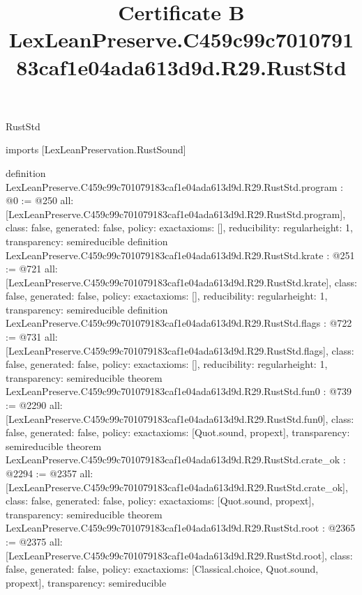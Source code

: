 \begin{lexlean}{RustStd}
\title{Certificate B LexLeanPreserve.C459c99c701079183caf1e04ada613d9d.R29.RustStd}
\begin{coremodule}
imports [LexLeanPreservation.RustSound]

definition LexLeanPreserve.C459c99c701079183caf1e04ada613d9d.R29.RustStd.program : @0 := @250 {
  all: [LexLeanPreserve.C459c99c701079183caf1e04ada613d9d.R29.RustStd.program],
  class: false,
  generated: false,
  policy: exact{axioms: []},
  reducibility: regular{height: 1},
  transparency: semireducible
}
definition LexLeanPreserve.C459c99c701079183caf1e04ada613d9d.R29.RustStd.krate : @251 := @721 {
  all: [LexLeanPreserve.C459c99c701079183caf1e04ada613d9d.R29.RustStd.krate],
  class: false,
  generated: false,
  policy: exact{axioms: []},
  reducibility: regular{height: 1},
  transparency: semireducible
}
definition LexLeanPreserve.C459c99c701079183caf1e04ada613d9d.R29.RustStd.flags : @722 := @731 {
  all: [LexLeanPreserve.C459c99c701079183caf1e04ada613d9d.R29.RustStd.flags],
  class: false,
  generated: false,
  policy: exact{axioms: []},
  reducibility: regular{height: 1},
  transparency: semireducible
}
theorem LexLeanPreserve.C459c99c701079183caf1e04ada613d9d.R29.RustStd.fun0 : @739 := @2290 {
  all: [LexLeanPreserve.C459c99c701079183caf1e04ada613d9d.R29.RustStd.fun0],
  class: false,
  generated: false,
  policy: exact{axioms: [Quot.sound, propext]},
  transparency: semireducible
}
theorem LexLeanPreserve.C459c99c701079183caf1e04ada613d9d.R29.RustStd.crate_ok : @2294 := @2357 {
  all: [LexLeanPreserve.C459c99c701079183caf1e04ada613d9d.R29.RustStd.crate_ok],
  class: false,
  generated: false,
  policy: exact{axioms: [Quot.sound, propext]},
  transparency: semireducible
}
theorem LexLeanPreserve.C459c99c701079183caf1e04ada613d9d.R29.RustStd.root : @2365 := @2375 {
  all: [LexLeanPreserve.C459c99c701079183caf1e04ada613d9d.R29.RustStd.root],
  class: false,
  generated: false,
  policy: exact{axioms: [Classical.choice, Quot.sound, propext]},
  transparency: semireducible
}


\end{coremodule}
\end{lexlean}
